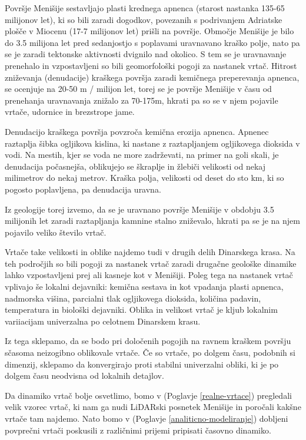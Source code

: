 \documentclass[a4paper, twoside, 12pt]{book}
\begin{document}
  Površje Menišije sestavljajo plasti krednega apnenca (starost nastanka 135-65 milijonov let), ki so bili zaradi dogodkov, povezanih s podrivanjem Adriatske plošče v Miocenu (17-7 milijonov let) prišli na površje. Območje Menišije je bilo do 3.5 milijona let pred sedanjostjo s poplavami uravnavano kraško polje, nato pa se je zaradi tektonske aktivnosti dvignilo nad okolico. S tem se je uravnavanje prenehalo in vzpostavljeni so bili geomorfološki pogoji za nastanek vrtač.
Hitrost zniževanja (denudacije) kraškega površja zaradi kemičnega preperevanja apnenca, se ocenjuje na 20-50 m / milijon let, torej se je površje Menišije v času od prenehanja uravnavanja znižalo za 70-175m, hkrati pa so se v njem pojavile vrtače, udornice in brezstrope jame. \cite{Vrabec2006} \cite{Placer2010}

Denudacijo kraškega površja povzroča kemična erozija apnenca. Apnenec raztaplja šibka ogljikova kislina, ki nastane z raztapljanjem ogljikovega dioksida v vodi. Na mestih, kjer se voda ne more zadrževati, na primer na goli skali, je denudacija počasnejša, oblikujejo se škraplje in žlebiči velikosti od nekaj milimetrov do nekaj metrov. Kraška polja, velikosti od deset do sto km, ki so pogosto poplavljena, pa denudacija uravna.

Iz geologije torej izvemo, da se je uravnano površje Menišije v obdobju 3.5 milijonih let zaradi raztapljanja kamnine stalno zniževalo, hkrati pa se je na njem pojavilo veliko število vrtač.

Vrtače take velikosti in oblike najdemo tudi v drugih delih Dinarskega krasa. Na teh področjih so bili pogoji za nastanek vrtač zaradi drugačne geološke dinamike lahko vzpostavljeni prej ali kasneje kot v Menišiji. Poleg tega na nastanek vrtač vplivajo še lokalni dejavniki: kemična sestava in kot vpadanja plasti apnenca, nadmorska višina, parcialni tlak ogljikovega dioksida, količina padavin, temperatura in biološki dejavniki. Oblika in velikost vrtač je kljub lokalnim variiacijam univerzalna po celotnem Dinarskem krasu.

Iz tega sklepamo, da se bodo pri določenih pogojih na ravnem kraškem površju sčasoma neizogibno oblikovale vrtače. Če so vrtače, po dolgem času, podobnih si dimenzij, sklepamo da konvergirajo proti stabilni univerzalni obliki, ki je po dolgem času neodvisna od lokalnih detajlov.

Da dinamiko vrtač bolje osvetlimo, bomo v (Poglavje \ref{realne-vrtace}) pregledali velik vzorec vrtač, ki nam ga nudi LiDARski posnetek Menišije in poročali kakšne vrtače tam najdemo. Nato bomo v (Poglavje \ref{analiticno-modeliranje}) dobljeni povprečni vrtači poskusili z različnimi prijemi pripisati časovno dinamiko.
\end{document}
